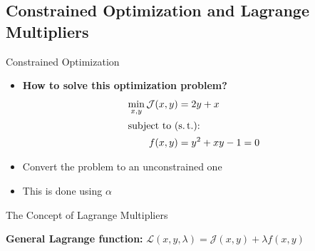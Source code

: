 \subsection{Constrained Optimization and Lagrange Multipliers}

\begin{frame}{Constrained Optimization}{}\important
	\begin{itemize}
		\item \textbf{How to solve this optimization problem?}
		\begin{align*}
			\min_{x, y} \mathcal{J}(x,y)
				&= 2y + x 		\\
			\intertext{subject to (s.\,t.):}
			f(x, y)
				&= y^2 +xy -1 = 0
		\end{align*}
		\item Convert the problem to an unconstrained one
		\item This is done using  $\alpha$
	\end{itemize}
\end{frame}


\begin{frame}{The Concept of Lagrange Multipliers}{}\important
	\begin{boxBlueNoFrame}
		\textbf{General Lagrange function:} $\mathcal{L}(x, y, \lambda) = \mathcal{J}(x,y) + \lambda f(x,y)$
	\end{boxBlueNoFrame}

	\vspace*{3mm}
\end{frame}


